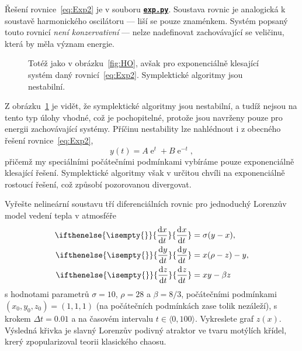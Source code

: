 \documentclass[a4paper,11pt,twoside]{article}
\DeclareMathOperator{\e}{e}
\renewcommand{\d}{\mathrm{d}}
\newcommand{\derivative}[3][]{\ifthenelse{\isempty{#1}}	    %
	{\frac{\d{#2}}{\d{#3}}}
	{\frac{\d^{#1}{#2}}{\d{#3}^{#1}}}
}
\def\ghfile#1#2{\textnormal{\textbf{\texttt{\href{https://github.com/PavelStransky/PCInPhysics2021/blob/main/#1#2}{#2}}}}}
\theoremstyle{red}
\theoremstyle{green}
\begin{document}
\begin{solution}
    Řešení rovnice~\eqref{eq:Exp2} je v souboru \ghfile{python/ode/}{exp.py}.
    Soustava rovnic je analogická k soustavě harmonického oscilátoru --- liší se pouze znaménkem.
    Systém popsaný touto rovnicí \emph{není konzervativní} --- nelze nadefinovat zachovávající se veličinu, která by měla význam energie.

    \begin{figure}[!htbp]
        \centering
        \caption{
            \protect\small
            Totéž jako v obrázku~\ref{fig:HO}, avšak pro exponenciálně klesající systém daný rovnicí~\eqref{eq:Exp2}.
            Symplektické algoritmy jsou nestabilní.
            }	
        \label{fig:Exp2}
    \end{figure}
    
    Z obrázku~\ref{fig:Exp2} je vidět, že symplektické algoritmy jsou nestabilní, a tudíž nejsou na tento typ úlohy vhodné, což je pochopitelné, protože jsou navrženy pouze pro energii zachovávající systémy.
    Příčinu nestability lze nahlédnout i z obecného řešení rovnice~\eqref{eq:Exp2},
    \begin{equation}
        y(t)=A\e^{t}+B\e^{-t},
    \end{equation}
    přičemž my speciálními počátečními podmínkami vybíráme pouze exponenciálně klesající řešení.
    Symplektické algoritmy však v určitou chvíli  na exponenciálně rostoucí řešení, což způsobí pozorovanou divergovat.
\end{solution}

\begin{task}
    Vyřešte nelineární soustavu tří diferenciálních rovnic pro jednoduchý Lorenzův model vedení tepla v atmosféře
    \begin{align}
        \derivative{x}{t}&=\sigma(y-x),\nonumber\\
        \derivative{y}{t}&=x(\rho-z)-y,\\
    \label{eq:Lorenz}
        \derivative{z}{t}&=xy-\beta z\nonumber
    \end{align}
    s hodnotami parametrů $\sigma=10$, $\rho=28$ a $\beta=8/3$, počátečními podmínkami $(x_0, y_0, z_0)=(1,1,1)$ (na počátečních podmínkách zase tolik nezáleží), s krokem $\Delta t=0.01$ a na časovém intervalu $t\in\langle0,100\rangle$.
    Vykreslete graf $z(x)$.
    Výsledná křivka je slavný Lorenzův podivný atraktor ve tvaru motýlích křídel, krerý zpopularizoval teorii klasického chaosu.
\end{task}
\end{document}
